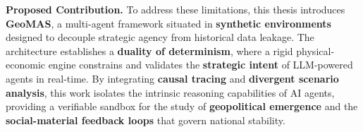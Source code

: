 \bigskip
\textbf{Proposed Contribution.} To address these limitations, this thesis introduces \textbf{GeoMAS}, a multi-agent framework situated in \textbf{synthetic environments} designed to decouple strategic agency from historical data leakage. The architecture establishes a \textbf{duality of determinism}, where a rigid physical-economic engine constrains and validates the \textbf{strategic intent} of LLM-powered agents in real-time. By integrating \textbf{causal tracing} and \textbf{divergent scenario analysis}, this work isolates the intrinsic reasoning capabilities of AI agents, providing a verifiable sandbox for the study of \textbf{geopolitical emergence} and the \textbf{social-material feedback loops} that govern national stability.

